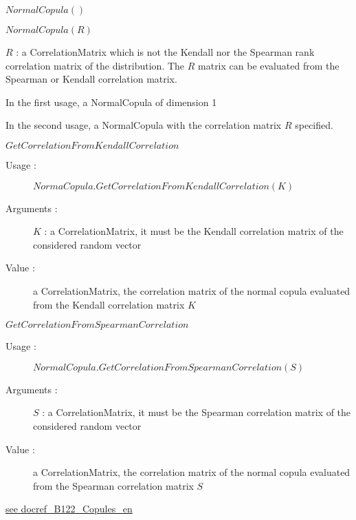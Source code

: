 \begin{description}

\item[Usage :] \rule{0pt}{1em}
  \begin{description}
  \item $NormalCopula()$
  \item $NormalCopula(R)$
  \end{description}

\item[Arguments :] $R$  : a CorrelationMatrix which is not the Kendall nor the Spearman rank correlation matrix of the distribution. The $R$ matrix  can be evaluated from the Spearman or Kendall correlation matrix.

\item[Value :] \rule{0pt}{1em}
  \begin{description}
  \item In the first usage, a NormalCopula  of dimension 1
  \item In the second usage, a NormalCopula  with the correlation matrix $R$ specified.
  \end{description}

\item[Some methods :]  \rule{0pt}{1em}
  \begin{description}
  \item $GetCorrelationFromKendallCorrelation$
    \begin{description}
    \item[Usage :] $NormaCopula.GetCorrelationFromKendallCorrelation(K)$
    \item[Arguments :] $K$ : a CorrelationMatrix, it must be the Kendall correlation matrix of the considered random vector
    \item[Value :] a CorrelationMatrix, the correlation matrix of the normal copula evaluated from the Kendall correlation matrix $K$
    \end{description}
    \bigskip

  \item $GetCorrelationFromSpearmanCorrelation$
    \begin{description}
    \item[Usage :] $NormalCopula.GetCorrelationFromSpearmanCorrelation(S)$
    \item[Arguments :]$S$ : a CorrelationMatrix, it must be the Spearman correlation matrix of the considered random vector
    \item[Value :] a CorrelationMatrix, the correlation matrix of the normal copula evaluated from the Spearman correlation matrix $S$
    \end{description}
  \end{description}
\item[Links :]
  \href{./Version/docref_B122_Copules_en.pdf}{see docref\_B122\_Copules\_en}
\end{description}


